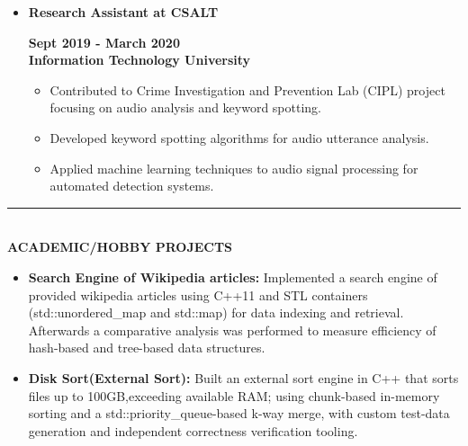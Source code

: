 \documentclass[10pt,a4paper]{article}
\newcommand{\MyHorizontalLine}{\noindent\rule{\linewidth}{1.5pt}\\}
\begin{document}
\begin{itemize}
		\begin{itemize}
			\item Developed cross-platform firewall desktop application using C, C++, Qt, and Python for macOS, Linux, and Windows.
			\item Implemented socket programming and SDP protocol for TCP/UDP communication between controllers, gateways, and clients.
			\item Integrated Single Packet Authentication (SPA) for secure data packet transmission.
		\end{itemize}
		\item \raggedleft\textbf{Research Assistant at CSALT}
		\hfill
		\raggedright\textbf{Sept 2019 - March 2020}\\
		\textbf{Information Technology University}
		\begin{itemize}
			\item Contributed to Crime Investigation and Prevention Lab (CIPL) project focusing on audio analysis and keyword spotting.
			\item Developed keyword spotting algorithms for audio utterance analysis.
			\item Applied machine learning techniques to audio signal processing for automated detection systems.
		\end{itemize}
	\end{itemize}
	\MyHorizontalLine
	\textbf{ACADEMIC/HOBBY PROJECTS}
	\begin{itemize}		
		\item \textbf{Search Engine of Wikipedia articles:} Implemented a search engine of provided wikipedia articles using C++11 and STL containers (std::unordered\_map and std::map) for data indexing and retrieval. Afterwards a comparative analysis was performed to measure efficiency of hash-based and tree-based data structures.
		\item \textbf{Disk Sort(External Sort):} Built an external sort engine in C++ that sorts files up to 100GB,exceeding available RAM; using chunk-based in-memory sorting and a std::priority\_queue-based k-way merge, with custom test-data generation and independent correctness verification tooling.
	
	\end{itemize}
\end{document}
